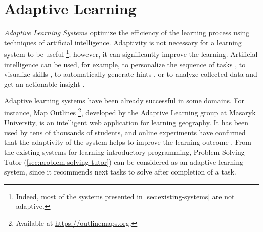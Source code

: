 \chapter{Adaptive Learning}
\label{chap:adaptive-learning}


\emph{Adaptive Learning Systems}
optimize the efficiency of the learning process
using techniques of artificial intelligence.
Adaptivity is not necessary for a learning system to be useful%
\footnote{Indeed, most of the systems presented in \cref{sec:existing-systems} are not adaptive.};
however, it can significantly improve the learning.
Artificial intelligence can be used, for example, to
personalize the sequence of tasks \cite{proso}, %
to visualize skills \cite{open-learner-model},
to automatically generate hints \cite{generating-hints}, %
or to analyze collected data and get an actionable insight \cite{alg.mastery}.


Adaptive learning systems have been already successful in some domains.
For instance, Map Outlines%
  \footnote{Available at \url{https://outlinemaps.org}.},
  developed by the Adaptive Learning group at Masaryk University,
  is an intelligent web application for learning geography.
It has been used by tens of thousands of students, and
  online experiments have confirmed
  that the adaptivity of the system helps to improve the learning outcome
  \cite{alg.evaluation-geography}.
From the existing systems for learning introductory programming,
Problem Solving Tutor (\cref{sec:problem-solving-tutor}) can be considered
as an adaptive learning system, since it recommends next tasks to solve after completion of a task.

